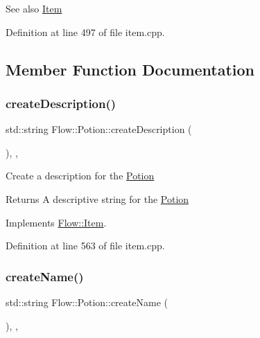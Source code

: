 \begin{DoxySeeAlso}{See also}
\hyperlink{class_flow_1_1_item}{Item} 
\end{DoxySeeAlso}


Definition at line 497 of file item.\+cpp.



\subsection{Member Function Documentation}
\hypertarget{class_flow_1_1_potion_a94d1c25d72b46c6e9d8eeb9880bdeca5}{}\label{class_flow_1_1_potion_a94d1c25d72b46c6e9d8eeb9880bdeca5} 
\subsubsection{\texorpdfstring{create\+Description()}{createDescription()}}
{\footnotesize\ttfamily std\+::string Flow\+::\+Potion\+::create\+Description (\begin{DoxyParamCaption}{ }\end{DoxyParamCaption})\hspace{0.3cm}{\ttfamily [override]}, {\ttfamily [protected]}, {\ttfamily [virtual]}}

Create a description for the \hyperlink{class_flow_1_1_potion}{Potion} \begin{DoxyReturn}{Returns}
A descriptive string for the \hyperlink{class_flow_1_1_potion}{Potion} 
\end{DoxyReturn}


Implements \hyperlink{class_flow_1_1_item_abf20647ff13aa4c761828d2d5508c504}{Flow\+::\+Item}.



Definition at line 563 of file item.\+cpp.

\hypertarget{class_flow_1_1_potion_ab21ab2dbee0ff4bb9dbe9cba6689ea34}{}\label{class_flow_1_1_potion_ab21ab2dbee0ff4bb9dbe9cba6689ea34} 
\subsubsection{\texorpdfstring{create\+Name()}{createName()}}
{\footnotesize\ttfamily std\+::string Flow\+::\+Potion\+::create\+Name (\begin{DoxyParamCaption}{ }\end{DoxyParamCaption})\hspace{0.3cm}{\ttfamily [override]}, {\ttfamily [protected]}, {\ttfamily [virtual]}}

